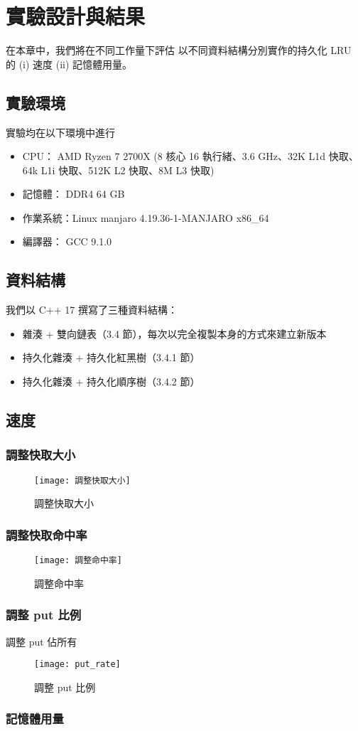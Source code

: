\chapter{實驗設計與結果}
\label{c:experiment}

在本章中，我們將在不同工作量下評估
以不同資料結構分別實作的持久化 LRU 的 (i) 速度 (ii) 記憶體用量。

\section{實驗環境}
實驗均在以下環境中進行

\begin{itemize}
\item CPU： AMD Ryzen 7 2700X (8 核心 16 執行緒、3.6 GHz、32K L1d 快取、64k L1i 快取、512K L2 快取、8M L3 快取)
\item 記憶體： DDR4 64 GB
\item 作業系統：Linux manjaro 4.19.36-1-MANJARO x86\_64
\item 編譯器： GCC 9.1.0
\end{itemize}

\section{資料結構}

我們以 C++ 17 撰寫了三種資料結構：

\begin{itemize}
\item 雜湊 + 雙向鏈表（3.4 節），每次以完全複製本身的方式來建立新版本
\item 持久化雜湊 + 持久化紅黑樹（3.4.1 節）
\item 持久化雜湊 + 持久化順序樹（3.4.2 節）
\end{itemize}

\section{速度}

\subsection{調整快取大小}

\begin{figure}[h!]
\texttt{[image: 調整快取大小]}
\caption{調整快取大小}
\end{figure}

\subsection{調整快取命中率}

\begin{figure}[h!]
\texttt{[image: 調整命中率]}
\caption{調整命中率}
\end{figure}

\subsection{調整 put 比例}

調整 put 佔所有

\begin{figure}[h!]
\texttt{[image: put\_rate]}
\caption{調整 put 比例}
\end{figure}

\subsection{記憶體用量}